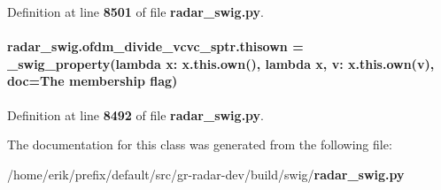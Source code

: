 Definition at line {\bf 8501} of file {\bf radar\+\_\+swig.\+py}.

\paragraph[{thisown}]{\setlength{\rightskip}{0pt plus 5cm}radar\+\_\+swig.\+ofdm\+\_\+divide\+\_\+vcvc\+\_\+sptr.\+thisown = {\bf \+\_\+swig\+\_\+property}(lambda x\+: x.\+this.\+own(), lambda {\bf x}, v\+: x.\+this.\+own(v), doc=\textquotesingle{}The membership flag\textquotesingle{})\hspace{0.3cm}{\ttfamily [static]}}\label{classradar__swig_1_1ofdm__divide__vcvc__sptr_a821e88ea4c434b6b47da4ee6a52cc62f}


Definition at line {\bf 8492} of file {\bf radar\+\_\+swig.\+py}.



The documentation for this class was generated from the following file\+:\begin{DoxyCompactItemize}
\item 
/home/erik/prefix/default/src/gr-\/radar-\/dev/build/swig/{\bf radar\+\_\+swig.\+py}\end{DoxyCompactItemize}
